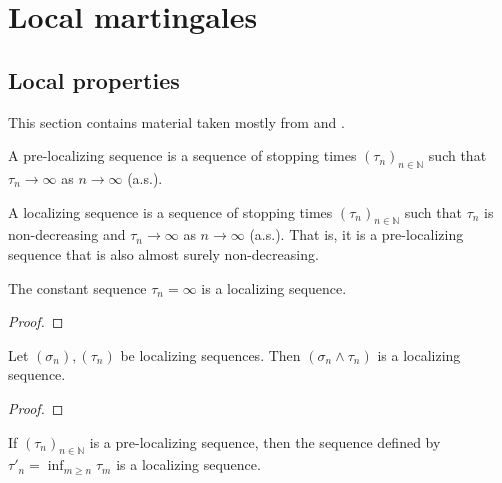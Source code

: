 \chapter{Local martingales}

\section{Local properties}

This section contains material taken mostly from \cite[Chapters 10 and 18]{kallenberg2021} and \cite{almostsuremath}.


\begin{definition}\label{def:preLocalizingSequence}
A pre-localizing sequence is a sequence of stopping times $(\tau_n)_{n \in \mathbb{N}}$ such that $\tau_n \to \infty$ as $n \to \infty$ (a.s.).
\end{definition}


\begin{definition}\label{def:localizingSequence}
A localizing sequence is a sequence of stopping times $(\tau_n)_{n \in \mathbb{N}}$ such that $\tau_n$ is non-decreasing and $\tau_n \to \infty$ as $n \to \infty$ (a.s.).
That is, it is a pre-localizing sequence that is also almost surely non-decreasing.
\end{definition}


\begin{lemma}\label{lem:localizingSequence_const_top}
The constant sequence $\tau_n = \infty$ is a localizing sequence.
\end{lemma}

\begin{proof}
\end{proof}


\begin{lemma}\label{lem:localizingSequence_min}
Let $(\sigma_n), (\tau_n)$ be localizing sequences.
Then $(\sigma_n \wedge \tau_n)$ is a localizing sequence.
\end{lemma}

\begin{proof}
\end{proof}


\begin{lemma}\label{lem:isLocalizingSequence_of_isPreLocalizingSequence}
  \leanok
If $(\tau_n)_{n \in \mathbb{N}}$ is a pre-localizing sequence, then the sequence defined by $\tau'_n = \inf_{m \ge n} \tau_m$ is a localizing sequence.
\end{lemma}

